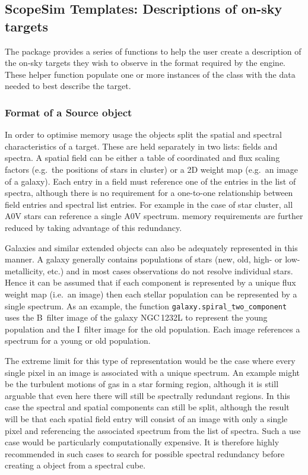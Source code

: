 \subsection{ScopeSim Templates: Descriptions of on-sky targets}
\label{scopesim-templates-descriptions-of-on-sky-targets}

The \scopesimtemplates{} package provides a series of functions to help the user create a description of the on-sky targets they wish to observe in the format required by the \ScopeSim{} engine.
These helper function populate one or more instances of the \ScopeSim{} \Source{} class with the data needed to best describe the target.


\subsubsection{Format of a Source object}
\label{format-of-a-source-object}

In order to optimise memory usage the \Source{} objects split the spatial and spectral characteristics of a target.\cite{schmalzl2012}
These are held separately in two lists: fields and spectra.
A spatial field can be either a table of coordinated and flux scaling factors (e.g.~the positions of stars in cluster) or a 2D weight map (e.g.~an image of a galaxy).
Each entry in a field must reference one of the entries in the list of spectra, although there is no requirement for a one-to-one relationship between field entries and spectral list entries.
For example in the case of star cluster, all A0V stars can reference a single A0V spectrum.
\ScopeSim{} memory requirements are further reduced by taking advantage of this redundancy.

Galaxies and similar extended objects can also be adequately represented in this manner.
A galaxy generally contains populations of stars (new, old, high- or low-metallicity, etc.) and in most cases observations do not resolve individual stars.
Hence it can be assumed that if each component is represented by a unique flux weight map (i.e.~an image) then each stellar population can be represented by a single spectrum.
As an example, the \scopesimtemplates{} function \lstinline{galaxy.spiral_two_component} uses the B~filter image of the galaxy NGC\,1232L to represent the young population and the I~filter image for the old population.
Each image references a spectrum for a young or old population\cite{brown2014}.

The extreme limit for this type of representation would be the case where every single pixel in an image is associated with a unique spectrum.
An example might be the turbulent motions of gas in a star forming region, although it is still arguable that even here there will still be spectrally redundant regions.
In this case the spectral and spatial components can still be split, although the result will be that each spatial field entry will consist of an image with only a single pixel and referencing the associated spectrum from the list of spectra.
Such a use case would be particularly computationally expensive.
It is therefore highly recommended in such cases to search for possible spectral redundancy before creating a \Source{} object from a spectral cube.


